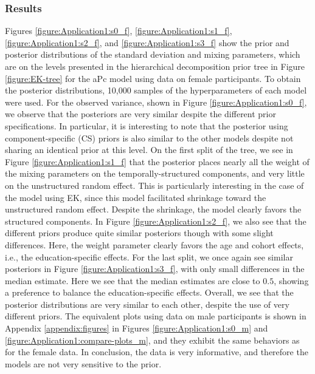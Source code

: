 \FloatBarrier
\subsubsection{Results}
\label{section:application1:prior-sens-result}
Figures \ref{figure:Application1:s0_f}, \ref{figure:Application1:s1_f}, \ref{figure:Application1:s2_f}, and \ref{figure:Application1:s3_f} show the prior and posterior distributions of the standard deviation and mixing parameters, which are on the levels presented in the hierarchical decomposition prior tree in Figure \ref{figure:EK-tree} for the aPc model using data on female participants. To obtain the posterior distributions, 10,000 samples of the hyperparameters of each model were used. For the observed variance, shown in Figure \ref{figure:Application1:s0_f}, we observe that the posteriors are very similar despite the different prior specifications. In particular, it is interesting to note that the posterior using component-specific (CS) priors is also similar to the other models despite not sharing an identical prior at this level. On the first split of the tree, we see in Figure \ref{figure:Application1:s1_f} that the posterior places nearly all the weight of the mixing parameters on the temporally-structured components, and very little on the unstructured random effect. This is particularly interesting in the case of the model using EK, since this model facilitated shrinkage toward the unstructured random effect. Despite the shrinkage, the model clearly favors the structured components. In Figure \ref{figure:Application1:s2_f}, we also see that the different priors produce quite similar posteriors though with some slight differences. Here, the weight parameter clearly favors the age and cohort effects, i.e., the education-specific effects. For the last split, we once again see similar posteriors in Figure \ref{figure:Application1:s3_f}, with only small differences in the median estimate. Here we see that the median estimates are close to $0.5$, showing a preference to balance the education-specific effects. Overall, we see that the posterior distributions are very similar to each other, despite the use of very different priors. The equivalent plots using data on male participants is shown in Appendix \ref{appendix:figures} in Figures \ref{figure:Application1:s0_m} and \ref{figure:Application1:compare-plots_m}, and they exhibit the same behaviors as for the female data. In conclusion, the data is very informative, and therefore the models are not very sensitive to the prior.

